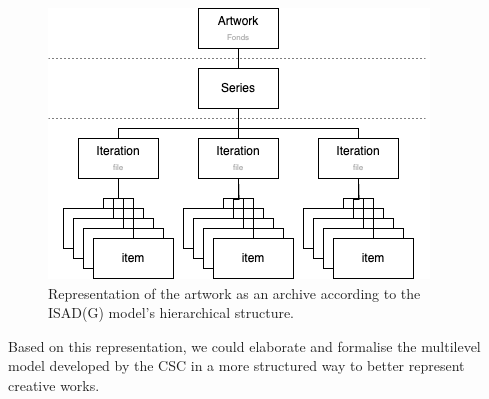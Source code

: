 \begin{figure}[!h]
    \centering
    \includegraphics[width=0.7\linewidth]{chapters/3-mdc_model-reactivation_workflow-instruction_template/image/graph03-isadg_art.png}
    \caption{Representation of the artwork as an archive according to the ISAD(G) model’s hierarchical structure.}
    \label{fig:c3-isadg_art}
\end{figure} 
Based on this representation, we could elaborate and formalise the multilevel model developed by the CSC in a more structured way to better represent creative works.

